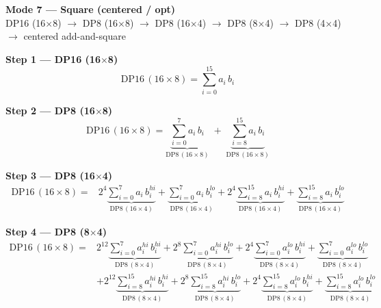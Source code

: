 \documentclass[fleqn]{article}
\newcommand{\DPop}[3]{\mathrm{DP#1}\,(#2\!\times\!#3)}
\begin{document}
\begin{center}
{\LARGE \textbf{Mode 7 --- Square (centered / opt)}}\\[4pt]
{\large DP16 (16$\times$8) $\rightarrow$ DP8 (16$\times$8) $\rightarrow$ DP8 (16$\times$4) $\rightarrow$ DP8 (8$\times$4) $\rightarrow$ DP8 (4$\times$4) $\rightarrow$ centered add-and-square}
\end{center}

\vspace{0.1em}

\textbf{Step 1 --- DP16 (16$\times$8)}
\[
\DPop{16}{16}{8} = \sum_{i=0}^{15} a_i \, b_i
\]

\textbf{Step 2 --- DP8 (16$\times$8)}
\[
\DPop{16}{16}{8}
  = \underbrace{\sum_{i=0}^{7} a_i \, b_i}_{\DPop{8}{16}{8}}
  \; + \; \underbrace{\sum_{i=8}^{15} a_i \, b_i}_{\DPop{8}{16}{8}}
\]

\textbf{Step 3 --- DP8 (16$\times$4)}
\begin{align*}
\DPop{16}{16}{8} = {}
  & 2^{4}\underbrace{\sum_{i=0}^{7} a_i \, b_i^{hi}}_{\DPop{8}{16}{4}}
  + \underbrace{\sum_{i=0}^{7} a_i \, b_i^{lo}}_{\DPop{8}{16}{4}}
  + 2^{4}\underbrace{\sum_{i=8}^{15} a_i \, b_i^{hi}}_{\DPop{8}{16}{4}}
  + \underbrace{\sum_{i=8}^{15} a_i \, b_i^{lo}}_{\DPop{8}{16}{4}}
\end{align*}

\textbf{Step 4 --- DP8 (8$\times$4)}
\begin{align*}
\DPop{16}{16}{8} = {}
  & 2^{12}\underbrace{\sum_{i=0}^{7} a_i^{hi} \, b_i^{hi}}_{\DPop{8}{8}{4}}
  + 2^{8}\underbrace{\sum_{i=0}^{7} a_i^{hi} \, b_i^{lo}}_{\DPop{8}{8}{4}}
  + 2^{4}\underbrace{\sum_{i=0}^{7} a_i^{lo} \, b_i^{hi}}_{\DPop{8}{8}{4}}
  + \underbrace{\sum_{i=0}^{7} a_i^{lo} \, b_i^{lo}}_{\DPop{8}{8}{4}} \\[0.6em]
  & + 2^{12}\underbrace{\sum_{i=8}^{15} a_i^{hi} \, b_i^{hi}}_{\DPop{8}{8}{4}}
  + 2^{8}\underbrace{\sum_{i=8}^{15} a_i^{hi} \, b_i^{lo}}_{\DPop{8}{8}{4}}
  + 2^{4}\underbrace{\sum_{i=8}^{15} a_i^{lo} \, b_i^{hi}}_{\DPop{8}{8}{4}}
  + \underbrace{\sum_{i=8}^{15} a_i^{lo} \, b_i^{lo}}_{\DPop{8}{8}{4}}
\end{align*}
\end{document}
